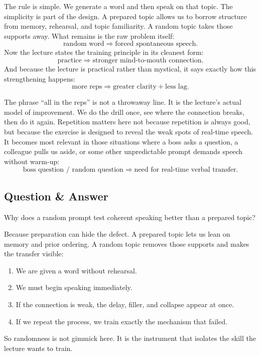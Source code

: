 The rule is simple. We generate a word and then speak on that topic. The simplicity is part of the design. A prepared topic allows us to borrow structure from memory, rehearsal, and topic familiarity. A random topic takes those supports away. What remains is the raw problem itself:
\begin{equation}
\text{random word} \Longrightarrow \text{forced spontaneous speech}.
\end{equation}
Now the lecture states the training principle in its cleanest form:
\begin{equation}
\text{practice} \Longrightarrow \text{stronger mind-to-mouth connection}.
\end{equation}
And because the lecture is practical rather than mystical, it says exactly how this strengthening happens:
\begin{equation}
\text{more reps} \Longrightarrow \text{greater clarity} + \text{less lag}.
\end{equation}

The phrase ``all in the reps'' is not a throwaway line. It is the lecture's actual model of improvement. We do the drill once, see where the connection breaks, then do it again. Repetition matters here not because repetition is always good, but because the exercise is designed to reveal the weak spots of real-time speech. It becomes most relevant in those situations where a boss asks a question, a colleague pulls us aside, or some other unpredictable prompt demands speech without warm-up:
\begin{equation}
\text{boss question / random question} \Longrightarrow \text{need for real-time verbal transfer}.
\end{equation}

\subsection{Question \& Answer}

Why does a random prompt test coherent speaking better than a prepared topic?

Because preparation can hide the defect. A prepared topic lets us lean on memory and prior ordering. A random topic removes those supports and makes the transfer visible:
\begin{enumerate}
\item We are given a word without rehearsal.
\item We must begin speaking immediately.
\item If the connection is weak, the delay, filler, and collapse appear at once.
\item If we repeat the process, we train exactly the mechanism that failed.
\end{enumerate}
So randomness is not gimmick here. It is the instrument that isolates the skill the lecture wants to train.

